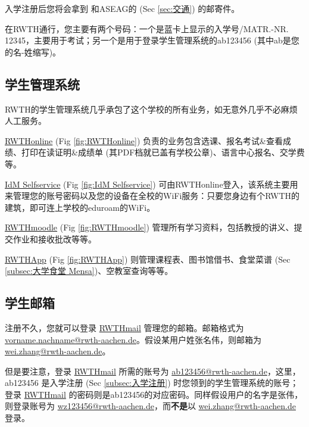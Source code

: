     入学注册后您将会拿到 和ASEAG的 (Sec \ref{sec:交通}) 的邮寄件。

    在RWTH通行，您主要有两个号码：一个是蓝卡上显示的入学号/MATR.-NR. 12345，主要用于考试；另一个是用于登录学生管理系统的ab123456 (其中ab是您的名-姓缩写)。

  \subsection{学生管理系统}\label{subsec:学生管理系统}

    RWTH的学生管理系统几乎承包了这个学校的所有业务，如无意外几乎不必麻烦人工服务。

    \href{https://online.rwth-aachen.de/}{RWTHonline} (Fig \ref{fig:RWTHonline}) 负责的业务包含选课、报名考试\&查看成绩、打印在读证明\&成绩单 (其PDF档就已盖有学校公章)、语言中心报名、交学费等。

    \href{https://idm.rwth-aachen.de/selfservice}{IdM Selfservice} (Fig \ref{fig:IdM Selfservice}) 可由RWTHonline登入，该系统主要用来管理您的账号密码以及您的设备在全校的WiFi服务：只要您身边有个RWTH的建筑，即可连上学校的eduroam的WiFi。

    \href{https://moodle.rwth-aachen.de/}{RWTHmoodle} (Fig \ref{fig:RWTHmoodle}) 管理所有学习资料，包括教授的讲义、提交作业和接收批改等等。

    \href{https://play.google.com/store/apps/details?id=de.rwth_aachen.rz.rwthapp&hl=en}{RWTHApp} (Fig \ref{fig:RWTHApp}) 则管理课程表、图书馆借书、食堂菜谱 (Sec \ref{subsec:大学食堂 Mensa})、空教室查询等等。

  \subsection{学生邮箱}\label{subsec:学生邮箱}

    注册不久，您就可以登录 \href{https://mail.rwth-aachen.de/}{RWTHmail} 管理您的邮箱。邮箱格式为 \href{mailto:vorname.nachname@rwth-aachen.de}{vorname.nachname@rwth-aachen.de}。假设某用户姓张名伟，则邮箱为 \href{mailto:wei.zhang@rwth-aachen.de}{wei.zhang@rwth-aachen.de}。

    但是要注意，登录 \href{https://mail.rwth-aachen.de/}{RWTHmail} 所需的账号为 \href{mailto:ab123456@rwth-aachen.de}{ab123456@rwth-aachen.de}，这里，ab123456 是入学注册 (Sec \ref{subsec:入学注册}) 时您领到的学生管理系统的账号；登录 \href{https://mail.rwth-aachen.de/}{RWTHmail} 的密码则是ab123456的对应密码。同样假设用户的名字是张伟，则登录账号为 \href{mailto:wz123456@rwth-aachen.de}{wz123456@rwth-aachen.de}，而\textbf{不是}以 \href{mailto:wei.zhang@rwth-aachen.de}{wei.zhang@rwth-aachen.de} 登录。

